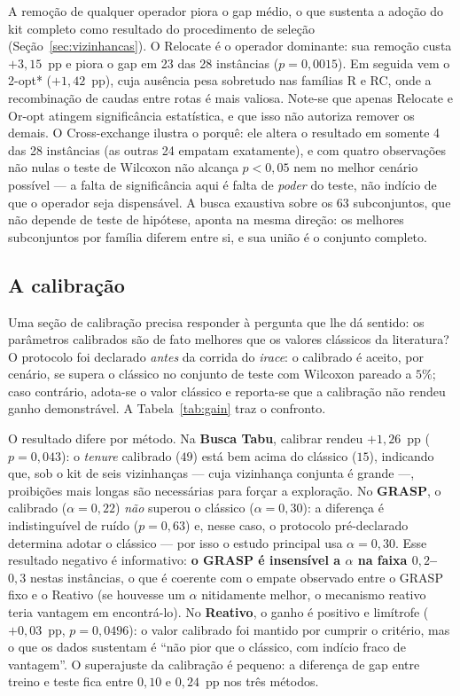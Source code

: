 \documentclass[12pt, a4paper]{article}
\begin{document}
A remoção de qualquer operador piora o gap médio, o que sustenta a adoção do kit completo como resultado do procedimento de seleção (Seção~\ref{sec:vizinhancas}). O Relocate é o operador dominante: sua remoção custa $+3{,}15$~pp e piora o gap em 23 das 28 instâncias ($p=0{,}0015$). Em seguida vem o 2-opt\hspace{0.5pt}* ($+1{,}42$~pp), cuja ausência pesa sobretudo nas famílias R e RC, onde a recombinação de caudas entre rotas é mais valiosa. Note-se que apenas Relocate e Or-opt atingem significância estatística, e que isso não autoriza remover os demais. O Cross-exchange ilustra o porquê: ele altera o resultado em somente 4 das 28 instâncias (as outras 24 empatam exatamente), e com quatro observações não nulas o teste de Wilcoxon não alcança $p<0{,}05$ nem no melhor cenário possível --- a falta de significância aqui é falta de \emph{poder} do teste, não indício de que o operador seja dispensável. A busca exaustiva sobre os 63 subconjuntos, que não depende de teste de hipótese, aponta na mesma direção: os melhores subconjuntos por família diferem entre si, e sua união é o conjunto completo.

\subsection{A calibração}\label{sec:gain}
Uma seção de calibração precisa responder à pergunta que lhe dá sentido: os parâmetros calibrados são de fato melhores que os valores clássicos da literatura? O protocolo foi declarado \emph{antes} da corrida do \textit{irace}: o calibrado é aceito, por cenário, se supera o clássico no conjunto de teste com Wilcoxon pareado a $5\%$; caso contrário, adota-se o valor clássico e reporta-se que a calibração não rendeu ganho demonstrável. A Tabela~\ref{tab:gain} traz o confronto.



O resultado difere por método. Na \textbf{Busca Tabu}, calibrar rendeu $+1{,}26$~pp ($p=0{,}043$): o \textit{tenure} calibrado ($49$) está bem acima do clássico ($15$), indicando que, sob o kit de seis vizinhanças --- cuja vizinhança conjunta é grande ---, proibições mais longas são necessárias para forçar a exploração. No \textbf{GRASP}, o calibrado ($\alpha=0{,}22$) \emph{não} superou o clássico ($\alpha=0{,}30$): a diferença é indistinguível de ruído ($p=0{,}63$) e, nesse caso, o protocolo pré-declarado determina adotar o clássico --- por isso o estudo principal usa $\alpha=0{,}30$. Esse resultado negativo é informativo: \textbf{o GRASP é insensível a $\alpha$ na faixa $0{,}2$--$0{,}3$} nestas instâncias, o que é coerente com o empate observado entre o GRASP fixo e o Reativo (se houvesse um $\alpha$ nitidamente melhor, o mecanismo reativo teria vantagem em encontrá-lo). No \textbf{Reativo}, o ganho é positivo e limítrofe ($+0{,}03$~pp, $p=0{,}0496$): o valor calibrado foi mantido por cumprir o critério, mas o que os dados sustentam é ``não pior que o clássico, com indício fraco de vantagem''. O superajuste da calibração é pequeno: a diferença de gap entre treino e teste fica entre $0{,}10$ e $0{,}24$~pp nos três métodos.
\end{document}
